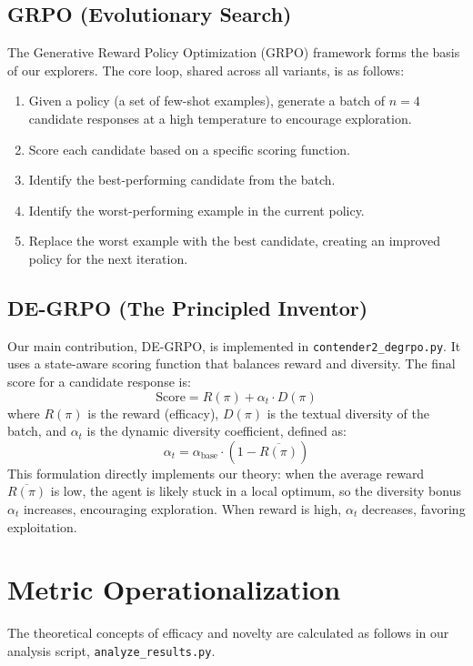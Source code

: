 \subsection{GRPO (Evolutionary Search)}
The Generative Reward Policy Optimization (GRPO) framework forms the basis of our explorers. The core loop, shared across all variants, is as follows:
\begin{enumerate}
    \item Given a policy (a set of few-shot examples), generate a batch of $n=4$ candidate responses at a high temperature to encourage exploration.
    \item Score each candidate based on a specific scoring function.
    \item Identify the best-performing candidate from the batch.
    \item Identify the worst-performing example in the current policy.
    \item Replace the worst example with the best candidate, creating an improved policy for the next iteration.
\end{enumerate}

\subsection{DE-GRPO (The Principled Inventor)}
Our main contribution, DE-GRPO, is implemented in \texttt{contender2\_degrpo.py}. It uses a state-aware scoring function that balances reward and diversity. The final score for a candidate response is:
\[ \text{Score} = R(\pi) + \alpha_t \cdot D(\pi) \]
where $R(\pi)$ is the reward (efficacy), $D(\pi)$ is the textual diversity of the batch, and $\alpha_t$ is the dynamic diversity coefficient, defined as:
\[ \alpha_t = \alpha_{\text{base}} \cdot (1 - \overline{R(\pi)}) \]
This formulation directly implements our theory: when the average reward $\overline{R(\pi)}$ is low, the agent is likely stuck in a local optimum, so the diversity bonus $\alpha_t$ increases, encouraging exploration. When reward is high, $\alpha_t$ decreases, favoring exploitation.

\section{Metric Operationalization}
\label{sec:metrics}
The theoretical concepts of efficacy and novelty are calculated as follows in our analysis script, \texttt{analyze\_results.py}.

